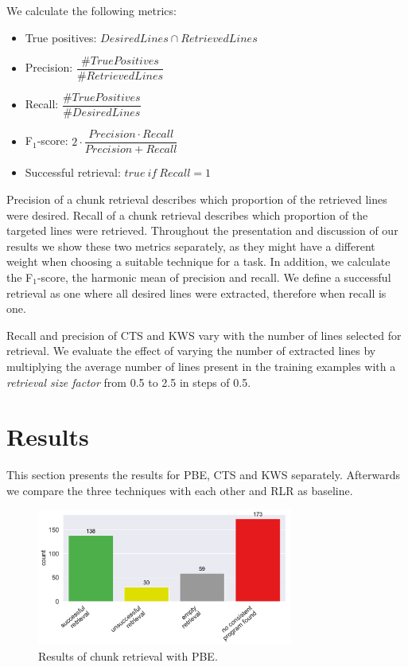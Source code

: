 \documentclass[\myrootdir/main.tex]{subfiles}
\begin{document}
We calculate the following metrics:
\begin{itemize}
	 \itemsep0.75em
	\item True positives: $\mathit{DesiredLines} \cap \mathit{RetrievedLines}$
	\item Precision: $\dfrac{\# \mathit{TruePositives}}{\# \mathit{RetrievedLines}}$
	\item Recall: $\dfrac{\# \mathit{TruePositives}}{\# \mathit{DesiredLines}}$
	\item F$_{1}$-score: $2 \cdot \dfrac{\mathit{Precision} \cdot \mathit{Recall}}{\mathit{Precision} + \mathit{Recall}}$
	\item Successful retrieval: $\mathit{true}\ \mathit{if}\ \mathit{Recall} = 1$
\end{itemize}

Precision of a chunk retrieval describes which proportion of the retrieved lines were desired.
Recall of a chunk retrieval describes which proportion of the targeted lines were retrieved.
Throughout the presentation and discussion of our results we show these two metrics separately, as they might have a different weight when choosing a suitable technique for a task.
In addition, we calculate the F$_{1}$-score, the harmonic mean of precision and recall.
We define a successful retrieval as one where all desired lines were extracted, therefore when recall is one.

Recall and precision of CTS and KWS vary with the number of lines selected for retrieval.
We evaluate the effect of varying the number of extracted lines by multiplying the average number of lines present in the training examples with a \emph{retrieval size factor} from 0.5 to 2.5 in steps of 0.5.

\section{Results}
This section presents the results for PBE, CTS and KWS separately.
Afterwards we compare the three techniques with each other and RLR as baseline.

\begin{figure}[hb]
		\centering
		\includegraphics[width=0.75\textwidth, clip]{img/big-study/failure-reason-PBE.pdf}
		\caption{Results of chunk retrieval with PBE.}
		\label{fig:failure-reason-PBE}
\end{figure}
\end{document}
